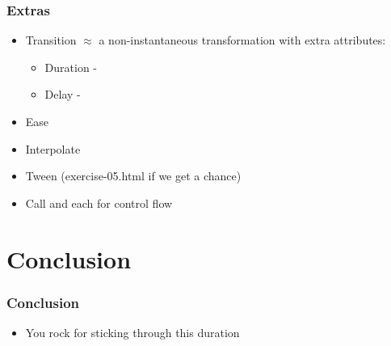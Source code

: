 \documentclass{beamer}
\begin{document}
\begin{frame}
    \frametitle{Extras}
    \begin{itemize}
    \item Transition $\approx$ a non-instantaneous transformation with extra attributes:
        \begin{itemize}
        \item Duration - 
        \item Delay -  
        \end{itemize}
    \item Ease
    \item Interpolate
    \item Tween (exercise-05.html if we get a chance)
    \item Call and each for control flow 
    \end{itemize}
\end{frame}



\section{Conclusion}


\begin{frame}
    \frametitle{Conclusion}
    \begin{itemize}
    \item You rock for sticking through this duration
    \end{itemize}
\end{frame}
\end{document}
